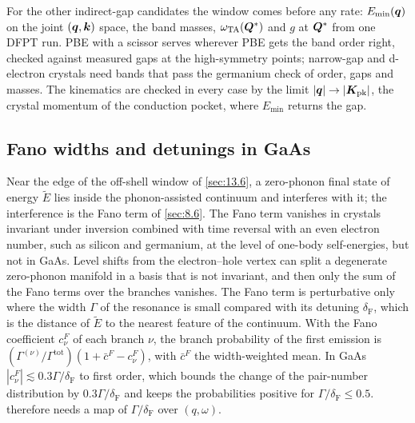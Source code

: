 For the other indirect-gap candidates the window comes before any rate: $E_{\mathrm{min}}(\bm{q})$ on the joint $(\bm{q},\bm{k})$ space, the band masses, $\omega_{\mathrm{TA}}(\bm{Q}^*)$ and $g$ at $\bm{Q}^*$ from one DFPT run. PBE with a scissor serves wherever PBE gets the band order right, checked against measured gaps at the high-symmetry points; narrow-gap and d-electron crystals need bands that pass the germanium check of order, gaps and masses. The kinematics are checked in every case by the limit $|\bm{q}| \to |\bm{K}_{\mathrm{pk}}|$, the crystal momentum of the conduction pocket, where $E_{\mathrm{min}}$ returns the gap.

\subsection{Fano widths and detunings in GaAs}

Near the edge of the off-shell window of \cref{sec:13.6}, a zero-phonon final state of energy $\tilde E$ lies inside the phonon-assisted continuum and interferes with it; the interference is the Fano term of \cref{sec:8.6}. The Fano term vanishes in crystals invariant under inversion combined with time reversal with an even electron number, such as silicon and germanium, at the level of one-body self-energies, but not in GaAs. Level shifts from the electron--hole vertex can split a degenerate zero-phonon manifold in a basis that is not invariant, and then only the sum of the Fano terms over the branches vanishes. The Fano term is perturbative only where the width $\varGamma$ of the resonance is small compared with its detuning $\delta_{\mathrm{F}}$, which is the distance of $\tilde E$ to the nearest feature of the continuum. With the Fano coefficient $c^F_\nu$ of each branch $\nu$, the branch probability of the first emission is $(\varGamma^{(\nu)}/\varGamma^{\mathrm{tot}})(1 + \bar c^F - c^F_\nu)$, with $\bar c^F$ the width-weighted mean. In GaAs $|c^F_\nu| \lesssim 0.3\varGamma/\delta_{\mathrm{F}}$ to first order, which bounds the change of the pair-number distribution by $0.3\varGamma/\delta_{\mathrm{F}}$ and keeps the probabilities positive for $\varGamma/\delta_{\mathrm{F}} \le 0.5$.  therefore needs a map of $\varGamma/\delta_{\mathrm{F}}$ over $(q,\omega)$.

